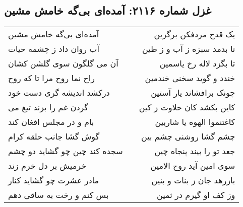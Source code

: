 \begin{center}
\section*{غزل شماره ۲۱۱۶: آمده‌ای بی‌گه خامش مشین}
\label{sec:2116}
\begin{longtable}{l p{0.5cm} r}
آمده‌ای بی‌گه خامش مشین
&&
یک قدح مردفکن برگزین
\\
آب روان داد ز چشمه حیات
&&
تا بدمد سبزه ز آب و ز طین
\\
آن می گلگون سوی گلشن کشان
&&
تا بگزد لاله رخ یاسمین
\\
راح نما روح مرا تا که روح
&&
خندد و گوید سخنی خندمین
\\
درکشد اندیشه گری دست خود
&&
چونک برافشاند یار آستین
\\
گردن غم را بزند تیغ می
&&
کاین بکشد کان حلاوت ز کین
\\
بام و در مجلس افغان کند
&&
کاغتنموا الهوه یا شاربین
\\
گوش گشا جانب حلقه کرام
&&
چشم گشا روشنی چشم بین
\\
سجده کند چین چو گشاید دو چشم
&&
جعد تو را بیند پنجاه چین
\\
خرمیش بر دل خرم زند
&&
سوی امین آید روح الامین
\\
مادر عشرت چو گشاید کنار
&&
بازرهد جان ز بنات و بنین
\\
بس کنم و رخت به ساقی دهم
&&
وز کف او گیرم در ثمین
\\
\end{longtable}
\end{center}
